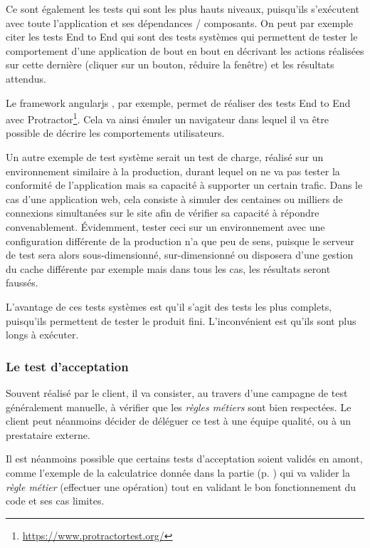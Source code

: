 Ce sont également les tests qui sont les plus hauts niveaux, puisqu'ils s'exécutent avec toute l'application et ses dépendances / composants. On peut par exemple citer les tests End to End qui sont des tests systèmes qui permettent de tester le comportement d'une application de bout en bout en décrivant les actions réalisées sur cette dernière (cliquer sur un bouton, réduire la fenêtre) et les résultats attendus.

Le \gls{framework} \gls{angularjs} , par exemple, permet de réaliser des tests End to End avec Protractor\footnote{\url{https://www.protractortest.org/}}. Cela va ainsi émuler un navigateur dans lequel il va être possible de décrire les comportements utilisateurs. 

Un autre exemple de test système serait un test de charge, réalisé sur un environnement similaire à la production, durant lequel on ne va pas tester la conformité de l'application mais sa capacité à supporter un certain trafic. Dans le cas d'une application web, cela consiste à simuler des centaines ou milliers de connexions simultanées sur le site afin de vérifier sa capacité à répondre convenablement. Évidemment, tester ceci sur un environnement avec une configuration différente de la production n'a que peu de sens, puisque le serveur de test sera alors sous-dimensionné, sur-dimensionné ou disposera d'une gestion du cache différente par exemple mais dans tous les cas, les résultats seront faussés.

L'avantage de ces tests systèmes est qu'il s'agit des tests les plus complets, puisqu'ils permettent de tester le produit fini. L'inconvénient est qu'ils sont plus longs à exécuter.

\subsubsection{Le test d'acceptation}\label{test-acceptation}

Souvent réalisé par le client, il va consister, au travers d'une campagne de test généralement manuelle, à vérifier que les \emph{règles métiers} sont bien respectées. Le client peut néanmoins décider de déléguer ce test à une équipe qualité, ou à un prestataire externe.

Il est néanmoins possible que certains tests d'acceptation soient validés en amont, comme l'exemple de la calculatrice donnée dans la partie  (p. \pageref{test-composant}) qui va valider la \emph{règle métier} (effectuer une opération) tout en validant le bon fonctionnement du code et ses cas limites.

